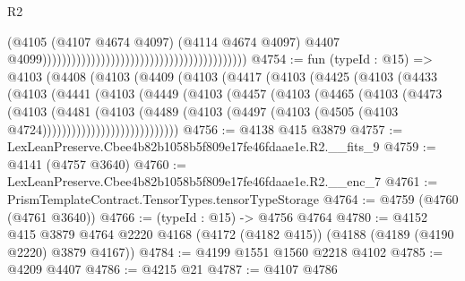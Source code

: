 \begin{lexlean}{R2}
\begin{coremodule}
                                                                                      (@4105
                                                                                        (@4107
                                                                                          @4674
                                                                                          @4097)
                                                                                        (@4114
                                                                                          @4674
                                                                                          @4097)
                                                                                        @4407
                                                                                        @4099))))))))))))))))))))))))))))))))))))))))))
@4754 := fun (typeId : @15) =>
  @4103
    (@4408
      (@4103
        (@4409
          (@4103
            (@4417
              (@4103
                (@4425
                  (@4103
                    (@4433
                      (@4103
                        (@4441
                          (@4103
                            (@4449
                              (@4103
                                (@4457
                                  (@4103
                                    (@4465
                                      (@4103
                                        (@4473
                                          (@4103
                                            (@4481
                                              (@4103
                                                (@4489
                                                  (@4103
                                                    (@4497
                                                      (@4103
                                                        (@4505
                                                          (@4103 @4724))))))))))))))))))))))))))))
@4756 := @4138 @415 @3879
@4757 := LexLeanPreserve.Cbee4b82b1058b5f809e17fe46fdaae1e.R2.__fits_9
@4759 := @4141 (@4757 @3640)
@4760 := LexLeanPreserve.Cbee4b82b1058b5f809e17fe46fdaae1e.R2.__enc_7
@4761 := PrismTemplateContract.TensorTypes.tensorTypeStorage
@4764 := @4759 (@4760 (@4761 @3640))
@4766 := (typeId : @15) -> @4756 @4764
@4780 := @4152
    @415
    @3879
    @4764
    @2220
    @4168
    (@4172 (@4182 @415))
    (@4188 (@4189 (@4190 @2220) @3879 @4167))
@4784 := @4199 @1551 @1560 @2218 @4102
@4785 := @4209 @4407
@4786 := @4215 @21
@4787 := @4107 @4786

\end{coremodule}
\end{lexlean}
